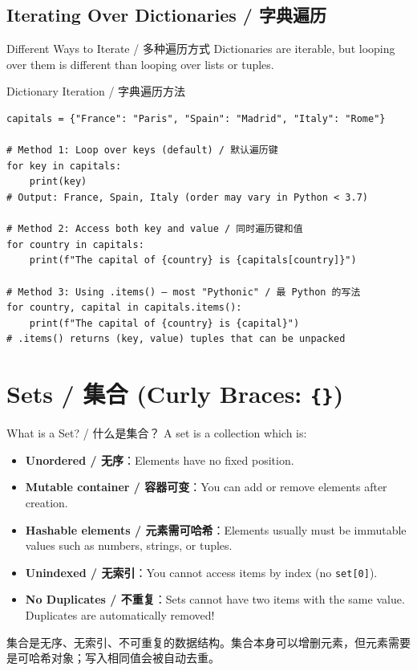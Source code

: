\documentclass[11pt,a4paper]{article}
\begin{document}
\subsection{Iterating Over Dictionaries / 字典遍历}

\begin{concept}{Different Ways to Iterate / 多种遍历方式}
    Dictionaries are iterable, but looping over them is different than looping over lists or tuples.
\end{concept}

\begin{examplebox}{Dictionary Iteration / 字典遍历方法}
\begin{lstlisting}
capitals = {"France": "Paris", "Spain": "Madrid", "Italy": "Rome"}

# Method 1: Loop over keys (default) / 默认遍历键
for key in capitals:
    print(key)
# Output: France, Spain, Italy (order may vary in Python < 3.7)

# Method 2: Access both key and value / 同时遍历键和值
for country in capitals:
    print(f"The capital of {country} is {capitals[country]}")

# Method 3: Using .items() — most "Pythonic" / 最 Python 的写法
for country, capital in capitals.items():
    print(f"The capital of {country} is {capital}")
# .items() returns (key, value) tuples that can be unpacked
\end{lstlisting}
\end{examplebox}

\section{Sets / 集合 (Curly Braces: \texttt{\{\}})}

\begin{concept}{What is a Set? / 什么是集合？}
    A set is a collection which is:
    \begin{itemize}[itemsep=0.3em]
        \item \textbf{Unordered / 无序}：Elements have no fixed position.
        \item \textbf{Mutable container / 容器可变}：You can add or remove elements after creation.
        \item \textbf{Hashable elements / 元素需可哈希}：Elements usually must be immutable values such as numbers, strings, or tuples.
        \item \textbf{Unindexed / 无索引}：You cannot access items by index (no \texttt{set[0]}).
        \item \textbf{No Duplicates / 不重复}：Sets cannot have two items with the same value. Duplicates are automatically removed!
    \end{itemize}
    集合是无序、无索引、不可重复的数据结构。集合本身可以增删元素，但元素需要是可哈希对象；写入相同值会被自动去重。
\end{concept}
\end{document}
